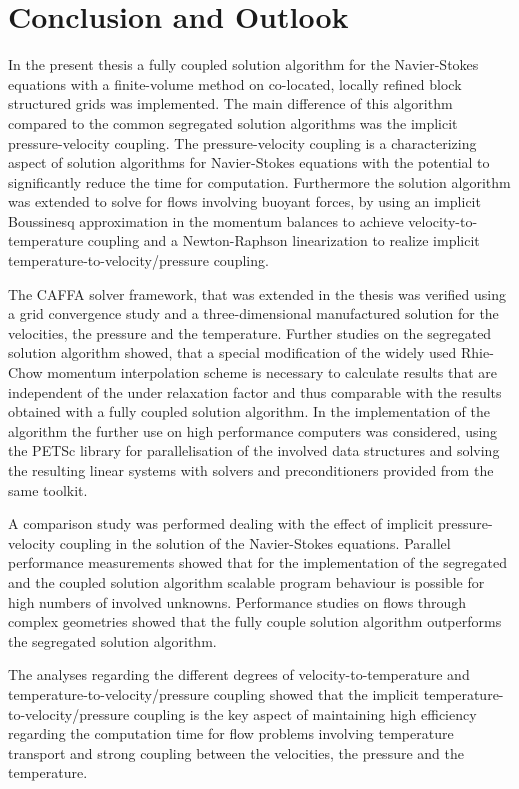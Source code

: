 \section{Conclusion and Outlook}

In the present thesis a fully coupled solution algorithm for the Navier-Stokes equations with a finite-volume method on co-located, locally refined block structured grids was implemented. The main difference of this algorithm compared to the common segregated solution algorithms was the implicit pressure-velocity coupling. The pressure-velocity coupling is a characterizing aspect of solution algorithms for Navier-Stokes equations with the potential to significantly reduce the time for computation. Furthermore the solution algorithm was extended to solve for flows involving buoyant forces, by using an implicit Boussinesq approximation in the momentum balances to achieve velocity-to-temperature coupling and a Newton-Raphson linearization to realize implicit temperature-to-velocity/pressure coupling.

The CAFFA solver framework, that was extended in the thesis was verified using a grid convergence study and a three-dimensional manufactured solution for the velocities, the pressure and the temperature. Further studies on the segregated solution algorithm showed, that a special modification of the widely used Rhie-Chow momentum interpolation scheme is necessary to calculate results that are independent of the under relaxation factor and thus comparable with the results obtained with a fully coupled solution algorithm. In the implementation of the algorithm the further use on high performance computers was considered, using the PETSc library for parallelisation of the involved data structures and solving the resulting linear systems with solvers and preconditioners provided from the same toolkit.

A comparison study was performed dealing with the effect of implicit pressure-velocity coupling in the solution of the Navier-Stokes equations. Parallel performance measurements showed that for the implementation of the segregated and the coupled solution algorithm scalable program behaviour is possible for high numbers of involved unknowns. Performance studies on flows through complex geometries showed that the fully couple solution algorithm outperforms the segregated solution algorithm. 

The analyses regarding the different degrees of velocity-to-temperature and temperature-to-velocity/pressure coupling showed that the implicit temperature-to-velocity/pressure coupling is the key aspect of maintaining high efficiency regarding the computation time for flow problems involving temperature transport and strong coupling between the velocities, the pressure and the temperature.

